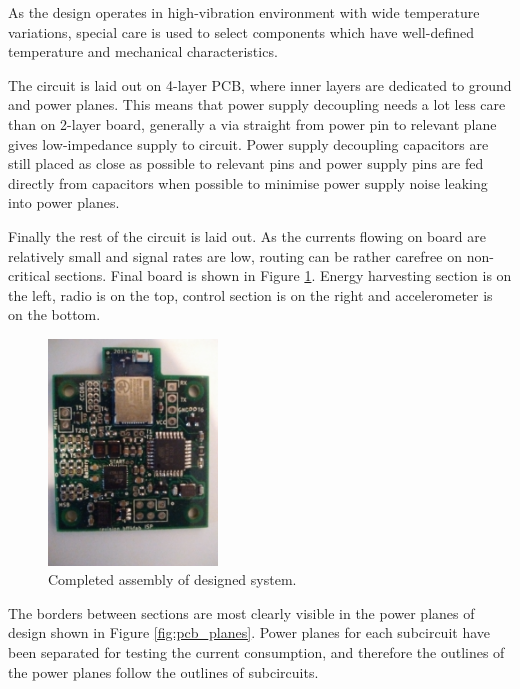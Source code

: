 As the design operates in high-vibration environment with wide temperature variations, special care is used to select components which have well-defined temperature and mechanical characteristics.

The circuit is laid out on 4-layer PCB, where inner layers are dedicated to ground and power planes. This means that power supply decoupling needs a lot less care than on 2-layer board, generally a via straight from power pin to relevant plane gives low-impedance supply to circuit. Power supply decoupling capacitors are still placed as close as possible to relevant pins and power supply pins are fed directly from capacitors when possible to minimise power supply noise leaking into power planes.

Finally the rest of the circuit is laid out. As the currents flowing on board are relatively small and signal rates are low, routing can be rather carefree on non-critical sections. Final board is shown in Figure \ref{fig:pcb_render}. Energy harvesting section is on the left, radio is on the top, control section is on the right and accelerometer is on the  bottom. 

\begin{figure}[htb]
  \begin{center}
    \includegraphics[height=6cm]{images/own_dwg/circuit/render.jpg}
  \end{center}
  \caption{\label{fig:pcb_render} Completed assembly of designed system.}
\end{figure}

The borders between sections are most clearly visible in the power planes of design shown in Figure \ref{fig:pcb_planes}. Power planes for each subcircuit have been separated for testing the current consumption, and therefore the outlines of the power planes follow the outlines of subcircuits.

